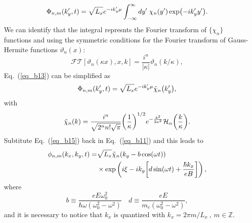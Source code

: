 \begin{equation} \label{eq_b13}
  \Phi_{n,m}({k'_y} ,t) =
  {\sqrt{L_x}} e^{-i {k'_y}\mu}
  \int_{-\infty}^{\infty} dy'\;
  \chi_{n}\qty(y')
  \exp(-i{k'_y} y').
\end{equation}
We can identify that the integral represnts the Fourier transform of $\{\chi_n\}$ functions and using the symmetric conditions \cite{bruus04} for the Fourier transform of Gauss-Hermite functions $\vartheta_n(x)$:
\begin{equation} \label{eq_b14}
  \mathcal{FT}[\vartheta_n(\kappa x),x,k] = \frac{i^n}{|\kappa|}\vartheta_n(k/\kappa),
\end{equation}
Eq.~(\ref{eq_b13}) can be simplified as
\begin{equation} \label{eq_b15}
  \Phi_{n,m}({k'_y} ,t) =
    \sqrt{L_x}e^{-i {k'_y}\mu}
    \tilde{\chi}_{n}\qty({k'_y}),
\end{equation}
with
\begin{equation} \label{eq_b16}
  \tilde{\chi}_{n}\qty(k) =
  \frac{i^n}{\sqrt{2^{n} n! \sqrt{\pi}}}
  \qty(\frac{1}{\kappa})^{1/2}
  e^{-\frac{k^2}{2 \kappa^2}}
  \mathcal{H}_{\alpha} \qty(\frac{k}{\kappa}).
\end{equation}
Subtitute Eq.~(\ref{eq_b15}) back in Eq.~(\ref{eq_b11}) and this leads to
\begin{equation} \label{eq_b17}
  \begin{aligned}
    \phi_{n,m}(k_x,k_y,t)  = &
    {\sqrt{L_x}}
    \tilde{\chi}_{n}\qty(k_y - b\cos(\omega t)) \\
    & \times
    \text{exp}\left(
      i\xi
      -ik_y  \qty[d\sin(\omega t) + \frac{\hbar k_x}{eB}]
    \right),
  \end{aligned}
\end{equation}
where
\begin{equation} \label{eq_b18}
  b \equiv
  \frac{eE\omega_0^2}{\hbar\omega(\omega_0^2 - \omega^2)} \quad
  d \equiv
 \frac{eE}{m_e(\omega_0^2 - \omega^2)},
\end{equation}
and it is necessary to notice that $k_x$ is quantized with $k_x = 2\pi m/L_x ~,~ m \in \mathbb{Z}$.
